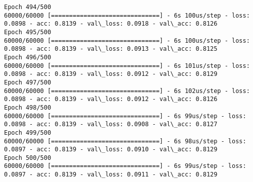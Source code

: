 \documentclass[11pt]{article}
\begin{document}
\begin{Verbatim}[commandchars=\\\{\}]
Epoch 494/500
60000/60000 [==============================] - 6s 100us/step - loss: 0.0898 - acc: 0.8139 - val\_loss: 0.0918 - val\_acc: 0.8126
Epoch 495/500
60000/60000 [==============================] - 6s 100us/step - loss: 0.0898 - acc: 0.8139 - val\_loss: 0.0913 - val\_acc: 0.8125
Epoch 496/500
60000/60000 [==============================] - 6s 101us/step - loss: 0.0898 - acc: 0.8139 - val\_loss: 0.0912 - val\_acc: 0.8129
Epoch 497/500
60000/60000 [==============================] - 6s 102us/step - loss: 0.0898 - acc: 0.8139 - val\_loss: 0.0912 - val\_acc: 0.8126
Epoch 498/500
60000/60000 [==============================] - 6s 99us/step - loss: 0.0898 - acc: 0.8139 - val\_loss: 0.0908 - val\_acc: 0.8127
Epoch 499/500
60000/60000 [==============================] - 6s 98us/step - loss: 0.0897 - acc: 0.8139 - val\_loss: 0.0910 - val\_acc: 0.8129
Epoch 500/500
60000/60000 [==============================] - 6s 99us/step - loss: 0.0897 - acc: 0.8139 - val\_loss: 0.0911 - val\_acc: 0.8129

    \end{Verbatim}
\end{document}
